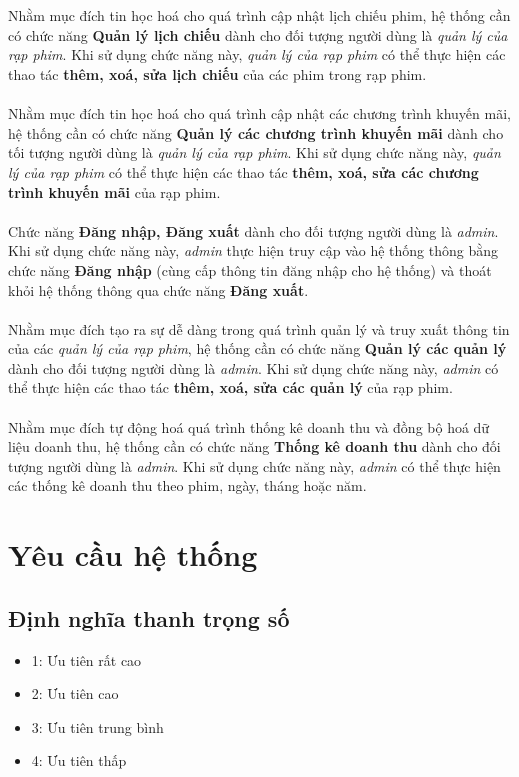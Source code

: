 \documentclass[a4paper, 12pt]{article}
\begin{document}
    \\\\
    Nhằm mục đích tin học hoá cho quá trình cập nhật lịch chiếu phim, hệ thống cần có chức năng \textbf{Quản lý lịch chiếu} dành cho đối tượng người dùng là \textit{quản lý của rạp phim}. Khi sử dụng chức năng này, \textit{quản lý của rạp phim} có thể thực hiện các thao tác \textbf{thêm, xoá, sửa lịch chiếu} của các phim trong rạp phim.
    \\\\
    Nhằm mục đích tin học hoá cho quá trình cập nhật các chương trình khuyến mãi, hệ thống cần có chức năng \textbf{Quản lý các chương trình khuyến mãi} dành cho tối tượng người dùng là \textit{quản lý của rạp phim}. Khi sử dụng chức năng này, \textit{quản lý của rạp phim} có thể thực hiện các thao tác \textbf{thêm, xoá, sửa các chương trình khuyến mãi} của rạp phim.
    \\\\
    Chức năng \textbf{Đăng nhập, Đăng xuất} dành cho đối tượng người dùng là \textit{admin}. Khi sử dụng chức năng này, \textit{admin} thực hiện truy cập vào hệ thống thông bằng chức năng \textbf{Đăng nhập} (cùng cấp thông tin đăng nhập cho hệ thống) và thoát khỏi hệ thống thông qua chức năng \textbf{Đăng xuất}.
    \\\\
    Nhằm mục đích tạo ra sự dễ dàng trong quá trình quản lý và truy xuất thông tin của các \textit{quản lý của rạp phim}, hệ thống cần có chức năng \textbf{Quản lý các quản lý} dành cho đối tượng người dùng là \textit{admin}. Khi sử dụng chức năng này, \textit{admin} có thể thực hiện các thao tác \textbf{thêm, xoá, sửa các quản lý} của rạp phim.
    \\\\
    Nhằm mục đích tự động hoá quá trình thống kê doanh thu và đồng bộ hoá dữ liệu doanh thu, hệ thống cần có chức năng \textbf{Thống kê doanh thu} dành cho đối tượng người dùng là \textit{admin}. Khi sử dụng chức năng này, \textit{admin} có thể thực hiện các thống kê doanh thu theo phim, ngày, tháng hoặc năm.
    \clearpage

    \section{Yêu cầu hệ thống}
    \label{sec:requirement}

    \subsection{Định nghĩa thanh trọng số}
    \begin{itemize}
        \item 1: Ưu tiên rất cao 
        \item 2: Ưu tiên cao 
        \item 3: Ưu tiên trung bình 
        \item 4: Ưu tiên thấp 
    \end{itemize}
\end{document}
